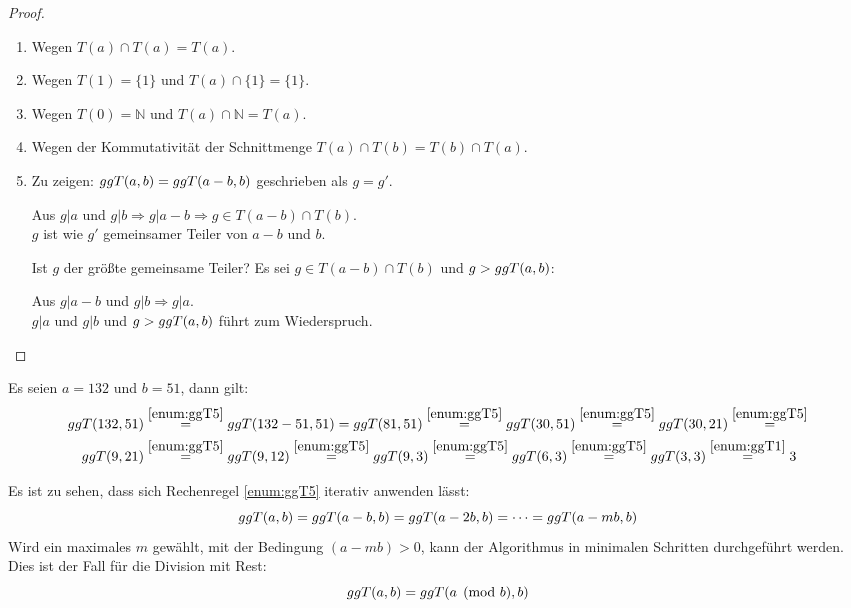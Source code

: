 \begin{proof}\mbox{}
  \begin{enumerate}
    \item Wegen $T(a) \cap T(a) = T(a)$.
    \item Wegen $T(1) = \{1\}$ und $T(a) \cap \{1\} = \{1\}$.
    \item Wegen $T(0) = \mathbb{N}$ und $T(a) \cap \mathbb{N} = T(a)$.
    \item Wegen der Kommutativität der Schnittmenge $T(a) \cap T(b) = T(b)\cap T(a)$.\newpage
    \item Zu zeigen: $ggT(a,b) = ggT(a - b,b)$ geschrieben als $g = g'$.
          \begin{center}
            Aus $ g|a$ und $g|b \Rightarrow g|a-b \Rightarrow g \in T(a-b) \cap T(b)$.\\
            $g$ ist wie $g'$ gemeinsamer Teiler von $a-b$ und $b$.
          \end{center}
          Ist $g$ der größte gemeinsame Teiler?
          Es sei $g \in T(a-b) \cap T(b)$ und $g > ggT(a,b)$:
          \begin{center}
            Aus $g|a-b$ und $g|b \Rightarrow g|a$.\\
            $g|a$ und $g|b$ und $g > ggT(a,b)$ führt zum Wiederspruch.
          \end{center}
  \end{enumerate}
\end{proof}

\begin{example}
  Es seien $a=132$ und $b=51$, dann gilt:
  \begin{align*}
    ggT(132,51) & \stackrel{\ref{enum:ggT5}}{=} ggT(132 - 51,51) =
    ggT(81,51) \stackrel{\ref{enum:ggT5}}{=} ggT(30,51) \stackrel{\ref{enum:ggT5}}{=}
    ggT(30,21) \stackrel{\ref{enum:ggT5}}{=}                                        \\
    ggT(9,21)   & \stackrel{\ref{enum:ggT5}}{=} ggT(9,12) \stackrel{\ref{enum:ggT5}}{=}
    ggT(9,3) \stackrel{\ref{enum:ggT5}}{=} ggT(6,3) \stackrel{\ref{enum:ggT5}}{=}
    ggT(3,3) \stackrel{\ref{enum:ggT1}}{=} 3
  \end{align*}
\end{example}

\noindent
Es ist zu sehen, dass sich Rechenregel \ref{enum:ggT5} iterativ anwenden lässt:
\begin{equation*}
  ggT(a,b) = ggT(a-b,b) = ggT(a-2b,b) = \dots = ggT(a-mb,b)
\end{equation*}
Wird ein maximales $m$ gewählt, mit der Bedingung $(a-mb) > 0$, kann der Algorithmus
in minimalen Schritten durchgeführt werden. Dies ist der Fall für die Division mit Rest:
\begin{equation*}
  ggT(a,b) = ggT(a \pmod{b},b)
\end{equation*}

